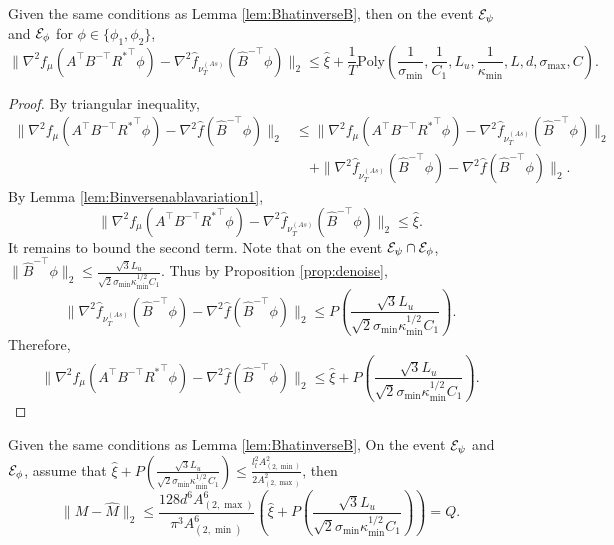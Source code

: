 \begin{lemma}
\label{lem:Binversenablavariation2}
Given the same conditions as Lemma \ref{lem:BhatinverseB}, then on the event $\mathcal{E}_{\psi}$ and $\mathcal{E}_{\phi}$ for $\phi \in \{\phi_1, \phi_2\}$,
\[
\|\nabla^2 f_{\mu}(A^{\top}B^{-\top}{R^*}^{\top}\phi) - \nabla^2 \hat{f}_{\nu_T^{(As)}}(\hat{B}^{-\top}\phi)  \|_2 
\le
 \hat{\xi}
+
\frac{1}{T}\text{Poly}\left(\frac{1}{\sigma_{\min}}, \frac{1}{C_1}, L_u, \frac{1}{\kappa_{\min}}, L, d, \sigma_{\max}, C\right).
\]
\end{lemma}
\begin{proof}
By triangular inequality, 
\begin{align*}
\|\nabla^2 f_{\mu}(A^{\top}B^{-\top}{R^*}^{\top}\phi) - \nabla^2 \hat{f}(\hat{B}^{-\top}\phi)  \|_2 
& \le 
\|\nabla^2 f_{\mu}(A^{\top}B^{-\top}{R^*}^{\top}\phi) - \nabla^2 \hat{f}_{\nu_T^{(As)}}(\hat{B}^{-\top}\phi)  \|_2 \\
& \quad +
\|\nabla^2 \hat{f}_{\nu_T^{(As)}}(\hat{B}^{-\top}\phi) - \nabla^2 \hat{f}(\hat{B}^{-\top}\phi)  \|_2. 
\end{align*}
By Lemma \ref{lem:Binversenablavariation1}, 
\[
\|\nabla^2 f_{\mu}(A^{\top}B^{-\top}{R^*}^{\top}\phi) - \nabla^2 \hat{f}_{\nu_T^{(As)}}(\hat{B}^{-\top}\phi)  \|_2 
\le \hat{\xi}. 
\]
It remains to bound the second term. 
Note that on the event $\mathcal{E}_{\psi}\cap\mathcal{E}_{\phi}$, $\|\hat{B}^{-\top}\phi\|_2 \le \frac{\sqrt{3}L_u}{\sqrt{2}\sigma_{\min}\kappa_{\min}^{1/2}C_1}$. 
Thus by Proposition \ref{prop:denoise}, 
\[
\|\nabla^2 \hat{f}_{\nu_T^{(As)}}(\hat{B}^{-\top}\phi) - \nabla^2 \hat{f}(\hat{B}^{-\top}\phi)  \|_2 \le P\left(\frac{\sqrt{3}L_u}{\sqrt{2}\sigma_{\min}\kappa_{\min}^{1/2}C_1}\right).
\]
Therefore, 
\[
\|\nabla^2 f_{\mu}(A^{\top}B^{-\top}{R^*}^{\top}\phi) - \nabla^2 \hat{f}(\hat{B}^{-\top}\phi)  \|_2 
\le 
 \hat{\xi}
+
P\left(\frac{\sqrt{3}L_u}{\sqrt{2}\sigma_{\min}\kappa_{\min}^{1/2}C_1}\right).
\]
\end{proof}
\begin{lemma}
\label{lem:Tvariantion}
Given the same conditions as Lemma \ref{lem:BhatinverseB}, On the event $\mathcal{E}_{\psi}$ and $\mathcal{E}_{\phi}$, assume that $\hat{\xi}
+
P\left(\frac{\sqrt{3}L_u}{\sqrt{2}\sigma_{\min}\kappa_{\min}^{1/2}C_1}\right)\le \frac{l_l^2 A^2_{(2,\min)}}{2A^2_{(2,\max)}}$, then 
\[
\|M - \hat{M}\|_2 \le  \frac{128d^6A^6_{(2,\max)}}{\pi^3 A^6_{(2,\min)}}\left(\hat{\xi}+
P\left(\frac{\sqrt{3}L_u}{\sqrt{2}\sigma_{\min}\kappa_{\min}^{1/2}C_1}\right)\right) = Q.
\]
\end{lemma}

